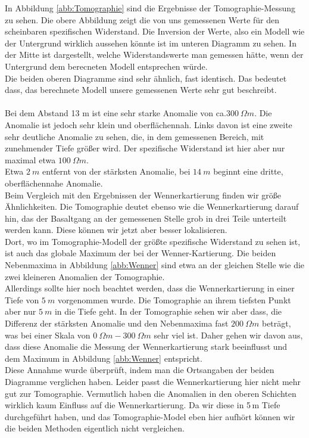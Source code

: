 In Abbildung \ref{abb:Tomographie} sind die Ergebnisse der Tomographie-Messung zu sehen. Die obere Abbildung zeigt die von uns gemessenen Werte für den scheinbaren spezifischen Widerstand. Die Inversion der Werte, also ein Modell wie der Untergrund 
wirklich aussehen könnte ist im unteren Diagramm zu sehen. In der Mitte ist dargestellt, welche Widerstandswerte man gemessen hätte, wenn der Untergrund dem berecneten Modell entsprechen würde.\\
Die beiden oberen Diagramme sind sehr ähnlich, fast identisch. Das bedeutet dass, das berechnete Modell unsere gemessenen Werte sehr gut beschreibt. \\
\\
Bei dem Abstand 13 m ist eine sehr starke Anomalie von ca.$ \SI{ 300}{\Omega m}$. Die Anomalie ist jedoch sehr klein und oberflächennah. Links davon ist eine zweite sehr deutliche Anomalie zu sehen, die, in dem gemessenen Bereich,
mit zunehmender Tiefe größer wird. Der spezifische Widerstand ist hier aber nur maximal etwa $\SI{100}{\Omega m}$. \\
Etwa $\SI{2}{m}$ entfernt von der stärksten Anomalie, bei  $\SI{14}{m}$ beginnt eine dritte, oberflächennahe Anomalie. \\
Beim Vergleich mit den Ergebnissen der Wennerkartierung finden wir größe Ähnlichkeiten. Die Tomographie deutet ebenso wie die Wennerkartierung darauf hin, das der Basaltgang an der gemessenen Stelle grob in drei Teile unterteilt werden kann. 
Diese können wir jetzt aber besser lokalisieren.\\
Dort, wo im Tomographie-Modell der größte spezifische Widerstand zu sehen ist, ist auch das globale Maximum der bei der Wenner-Kartierung. Die beiden Nebenmaxima in Abbildung \ref{abb:Wenner}
sind etwa an der gleichen Stelle wie die zwei kleineren Anomalien der Tomographie. \\ 
Allerdings sollte hier noch beachtet werden, dass die Wennerkartierung in einer Tiefe von $\SI{5}{m}$ vorgenommen wurde. Die Tomographie an ihrem tiefsten Punkt aber nur $\SI{5}{m}$ in die Tiefe geht.
In der Tomographie sehen wir aber dass, die Differenz der stärksten Anomalie und den Nebenmaxima fast $\SI{200}{\Omega m}$ beträgt, was bei einer Skala von $\SI{0}{\Omega m}- \SI{300}{\Omega m}$ sehr viel ist. 
Daher gehen wir davon aus, dass diese Anomalie die Messung der Wennerkartierung stark beeinflusst und dem Maximum in Abbildung \ref{abb:Wenner} entspricht.\\
Diese Annahme wurde überprüft, indem man die Ortsangaben der beiden Diagramme verglichen haben. Leider passt die Wennerkartierung hier nicht mehr gut zur Tomographie. Vermutlich haben die Anomalien in den oberen Schichten wirklich kaum Einfluss auf die Wennerkartierung. Da wir diese in 5\,m Tiefe durchgeführt haben, und das Tomographie-Model eben hier aufhört können wir die beiden Methoden eigentlich nicht vergleichen.


